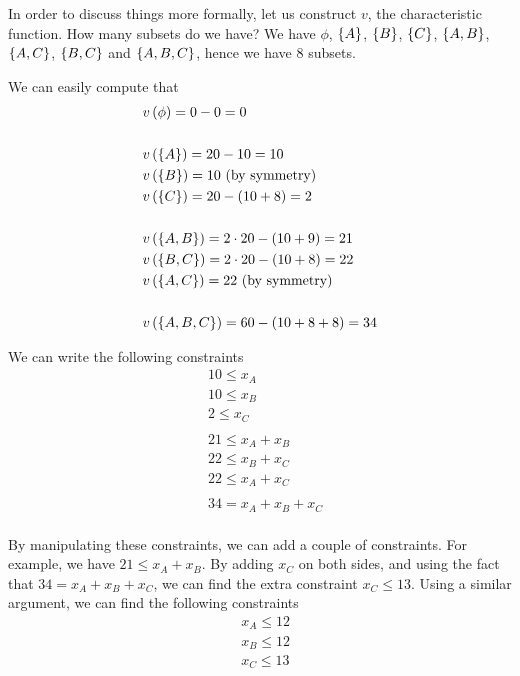 \begin{enumerate} [label=\alph*.]
	
	\vspace{5mm}
	
	In order to discuss things more formally, let us construct $v$, the characteristic function. How many subsets do we have? We have $\phi$, $\left\{A\right\}$, $\left\{B\right\}$, $\left\{C\right\}$, $\left\{A, B\right\}$, $\left\{A, C\right\}$, $\left\{B, C\right\}$ and $\left\{A, B, C\right\}$, hence we have 8 subsets.
	
	We can easily compute that
	\begin{align*}
	    & v \left(\phi\right) = 0 - 0 = 0 \\ \\
	    & v \left(\left\{A\right\}\right) = 20 - 10 = 10 \\
	    & v \left(\left\{B\right\}\right) = 10 \text{ (by symmetry) } \\
	    & v \left(\left\{C\right\}\right) = 20 - (10 + 8) = 2 \\ \\
	    & v \left(\left\{A, B\right\}\right) = 2 \cdot 20 - (10 + 9) = 21 \\
	    & v \left(\left\{B, C\right\}\right) = 2 \cdot 20 - (10 + 8) = 22 \\
	    & v \left(\left\{A, C\right\}\right) = 22 \text{ (by symmetry) } \\ \\
	    & v \left(\left\{A, B, C\right\}\right) = 60 - (10 + 8 + 8) = 34
	\end{align*}
	
	We can write the following constraints
	\begin{align*}
	    & 10 \leq x_{A} \\
	    & 10 \leq x_{B} \\
	    & 2 \leq x_{C} \\ \\
	    & 21 \leq x_{A} + x_{B} \\
	    & 22 \leq x_{B} + x_{C} \\
	    & 22 \leq x_{A} + x_{C} \\ \\
	    & 34 = x_{A} + x_{B} + x_{C} \\
	\end{align*}
	
	By manipulating these constraints, we can add a couple of constraints. For example, we have $21 \leq x_{A} + x_{B}$. By adding $x_{C}$ on both sides, and using the fact that $34 = x_{A} + x_{B} + x_{C}$, we can find the extra constraint $x_{C} \leq 13$. Using a similar argument, we can find the following constraints
	\begin{align*}
	    & x_{A} \leq 12 \\
	    & x_{B} \leq 12 \\
	    & x_{C} \leq 13 \\
	\end{align*}
	

\end{enumerate}
